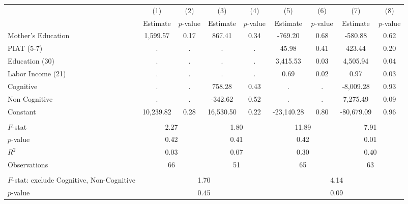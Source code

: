 \begin{tabular}{lcccccccc} \toprule
 & (1) & (2) & (3) & (4) & (5) & (6) & (7) & (8) \\
 & Estimate & $p$-value & Estimate & $p$-value  & Estimate & $p$-value  & Estimate & $p$-value  \\ \midrule 
Mother's Education &     1,599.57 &         0.17 &       867.41 &         0.34 &      -769.20 &         0.68 &      -580.88 &         0.62 \\  
PIAT (5-7) &            . &            . &            . &            . &        45.98 &         0.41 &       423.44 &         0.20 \\  
Education (30) &            . &            . &            . &            . &     3,415.53 &         0.03 &     4,505.94 &         0.04 \\  
Labor Income (21) &            . &            . &            . &            . &         0.69 &         0.02 &         0.97 &         0.03 \\  
Cognitive &            . &            . &       758.28 &         0.43 &            . &            . &    -8,009.28 &         0.93 \\  
Non Cognitive &            . &            . &      -342.62 &         0.52 &            . &            . &     7,275.49 &         0.09 \\  
Constant &    10,239.82 &         0.28 &    16,530.50 &         0.22 &   -23,140.28 &         0.80 &   -80,679.09 &         0.96 \\  \\ \midrule
$F$-stat &         \multicolumn{2}{c}{2.27} &              \multicolumn{2}{c}{1.80} &             \multicolumn{2}{c}{11.89} &               \multicolumn{2}{c}{7.91}  \\  
$p$-value &         \multicolumn{2}{c}{0.42} &              \multicolumn{2}{c}{0.41} &             \multicolumn{2}{c}{0.42} &               \multicolumn{2}{c}{0.01}  \\  
$R^2$ &         \multicolumn{2}{c}{0.03} &              \multicolumn{2}{c}{0.07} &             \multicolumn{2}{c}{0.30} &               \multicolumn{2}{c}{0.40}  \\  
Observations &         \multicolumn{2}{c}{66} &          \multicolumn{2}{c}{51} &              \multicolumn{2}{c}{65} &             \multicolumn{2}{c}{63}  \\  \\ \midrule
$F$-stat: exclude Cognitive, Non-Cognitive &              \multicolumn{4}{c}{1.70} &               \multicolumn{4}{c}{4.14}  \\  
$p$-value  &         \multicolumn{4}{c}{0.45} &                   \multicolumn{4}{c}{0.09} \\      \bottomrule \end{tabular}

